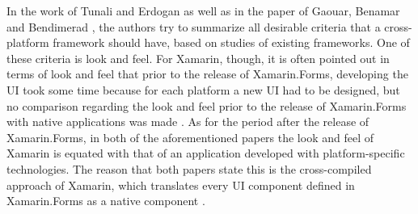 \documentclass[Bachelor,BIF,english]{twbook}
\begin{document}
In the work of Tunali and Erdogan \cite{tunali2015comparison} as well as in the paper of Gaouar, Benamar and Bendimerad \cite{GaouarBenamarBendimerad2016}, the authors try to summarize all desirable criteria that a cross-platform framework should have, based on studies of existing frameworks. One of these criteria is look and feel. For Xamarin, though, it is often pointed out in terms of look and feel that prior to the release of Xamarin.Forms, developing the UI took some time because for each platform a new UI had to be designed, but no comparison regarding the look and feel prior to the release of Xamarin.Forms with native applications was made \cite[p.~20]{GaouarBenamarBendimerad2016} \cite[p.~5]{tunali2015comparison}. As for the period after the release of Xamarin.Forms, in both of the aforementioned papers the look and feel of Xamarin is equated with that of an application developed with platform-specific technologies. The reason that both papers state this is the cross-compiled approach of Xamarin, which translates every UI component defined in Xamarin.Forms as a native component \cite[p.~21]{GaouarBenamarBendimerad2016} \cite[p.~5,~8]{tunali2015comparison}.

\newpage
\end{document}
